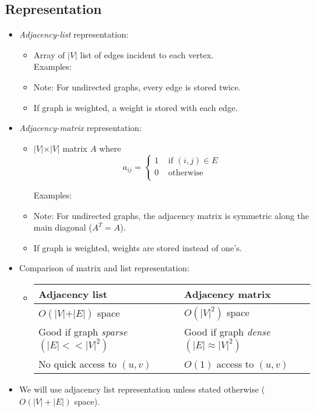 \subsection{Representation}
\begin{itemize}
	\item {\em Adjacency-list} representation:
	\begin{itemize}
		\item Array of $\vert V \vert$ list of edges incident to each
		vertex. \\
		
		Examples: \\
		\item Note: For undirected graphs, every edge is stored twice.
		\item If graph is weighted, a weight is stored with each edge.
	\end{itemize}
	
	
	\item {\em Adjacency-matrix} representation:
	\begin{itemize}
		\item $\vert V \vert \times \vert V \vert$ matrix $A$ where 
		\[ a_{ij} = \left\{ \begin{array}{ll}
		1        & \mbox{ if $(i,j) \in E$} \\
		0        & \mbox{ otherwise } \\
		\end{array}
		\right. \]
		
		Examples: \\
		\item Note: For undirected graphs, the adjacency matrix is
		symmetric along the main diagonal ($A^T = A$).
		\item If graph is weighted, weights are stored instead of one's.
	\end{itemize}
	\item Comparison of matrix and list representation: \\
	\begin{itemize}
		\item[]
		\begin{tabular}{l|l}
			Adjacency list & Adjacency matrix \\ \hline
			$O(\vert V \vert + \vert E \vert)$ space & $O(\vert V \vert ^2)$
			space \\
			Good if graph {\em sparse} $(\vert E \vert << \vert V
			\vert ^2)$ & Good if graph {\em dense} $(\vert E \vert \approx
			\vert V \vert ^2)$ \\
			No quick access to $(u,v)$ & $O(1)$ access to $(u,v)$ \\
		\end{tabular}
	\end{itemize}
	\item We will use adjacency list representation unless stated otherwise
	($O(|V|+|E|)$ space).
\end{itemize}


